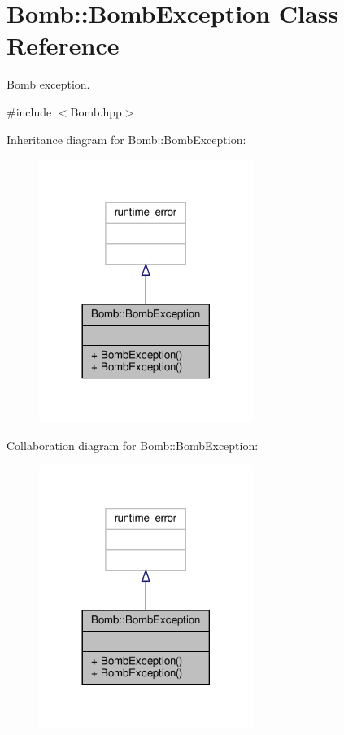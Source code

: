 \hypertarget{class_bomb_1_1_bomb_exception}{}\section{Bomb\+:\+:Bomb\+Exception Class Reference}
\label{class_bomb_1_1_bomb_exception}


\hyperlink{class_bomb}{Bomb} exception.  




{\ttfamily \#include $<$Bomb.\+hpp$>$}



Inheritance diagram for Bomb\+:\+:Bomb\+Exception\+:
\nopagebreak
\begin{figure}[H]
\begin{center}
\leavevmode
\includegraphics[width=197pt]{class_bomb_1_1_bomb_exception__inherit__graph}
\end{center}
\end{figure}


Collaboration diagram for Bomb\+:\+:Bomb\+Exception\+:
\nopagebreak
\begin{figure}[H]
\begin{center}
\leavevmode
\includegraphics[width=197pt]{class_bomb_1_1_bomb_exception__coll__graph}
\end{center}
\end{figure}
